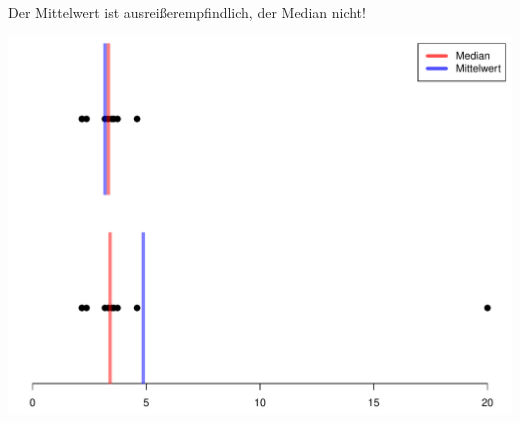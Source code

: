 \documentclass[t,11pt,aspectratio=169]{beamer}
\begin{document}
\begin{frame}
	Der Mittelwert ist ausreißerempfindlich, der Median nicht!
	\begin{center}
		\includegraphics[scale=0.4]{outlier.pdf}
	\end{center}
\end{frame}
\end{document}

